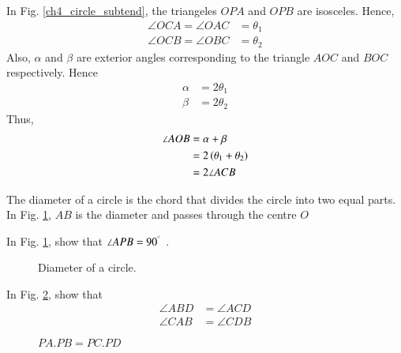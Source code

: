 \proof In Fig. \ref{ch4_circle_subtend}, the triangeles $OPA$ and $OPB$ are isosceles. Hence,
%
\begin{align}
\angle OCA = \angle OAC &= \theta_1 \\
\angle OCB = \angle OBC &= \theta_2
\end{align}
%
Also, $\alpha$ and $\beta$ are exterior angles corresponding to the triangle $AOC$ and $BOC$ respectively. Hence
%
\begin{align}
\alpha &= 2\theta_1 \\
\beta &= 2\theta_2
\end{align}
%
Thus,
%
\begin{align}
\angle AOB &= \alpha + \beta \\
&= 2\left(\theta_1 + \theta_2\right) \\
&= 2\angle ACB
\end{align}
%
\begin{definition}
	The diameter of a circle is the chord that divides the circle into two equal parts. In Fig. \ref{ch4_circle_dia}, $AB$ is the diameter and passes through the centre $O$
\end{definition}
%
\begin{problem}
In Fig. \ref{ch4_circle_dia}, show that $\angle APB = 90^{\degree}$ .
\end{problem}
%
\begin{figure}[!ht]
	\begin{center}
		
		\resizebox{\columnwidth}{!}{}
	\end{center}
	\caption{Diameter of a circle.}
	\label{ch4_circle_dia}	
\end{figure}
\begin{problem}
	In Fig. \ref{ch4_chord_product}, show that 
	\begin{equation}
	\begin{split}
\angle ABD &= \angle ACD \\
\angle CAB &= \angle CDB	
	\end{split}
	\end{equation}
\end{problem}
\begin{figure}[!ht]
	\begin{center}
		
		\resizebox{\columnwidth}{!}{}
	\end{center}
	\caption{$PA.PB = PC.PD$}
	\label{ch4_chord_product}	
\end{figure}
